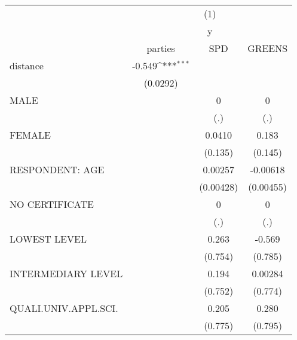 {
\def\sym#1{\ifmmode^{#1}\else\(^{#1}\)\fi}
\begin{tabular}{l*{3}{c}}
\hline\hline
                              &\multicolumn{3}{c}{(1)}                                    \\
                              &\multicolumn{3}{c}{y}                                      \\
                              &   parties         &       SPD         &    GREENS         \\
\hline
distance                      &    -0.549\sym{***}&                   &                   \\
                              &  (0.0292)         &                   &                   \\
[1em]
MALE                          &                   &         0         &         0         \\
                              &                   &       (.)         &       (.)         \\
[1em]
FEMALE                        &                   &    0.0410         &     0.183         \\
                              &                   &   (0.135)         &   (0.145)         \\
[1em]
RESPONDENT: AGE               &                   &   0.00257         &  -0.00618         \\
                              &                   & (0.00428)         & (0.00455)         \\
[1em]
NO CERTIFICATE                &                   &         0         &         0         \\
                              &                   &       (.)         &       (.)         \\
[1em]
LOWEST LEVEL                  &                   &     0.263         &    -0.569         \\
                              &                   &   (0.754)         &   (0.785)         \\
[1em]
INTERMEDIARY LEVEL            &                   &     0.194         &   0.00284         \\
                              &                   &   (0.752)         &   (0.774)         \\
[1em]
QUALI.UNIV.APPL.SCI.          &                   &     0.205         &     0.280         \\
                              &                   &   (0.775)         &   (0.795)         \\

\end{tabular}}

